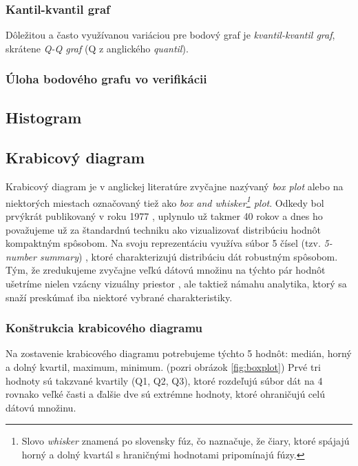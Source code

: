 \subsubsection{Kantil-kvantil graf}
Dôležitou a často využívanou variáciou pre bodový graf je \textit{kvantil-kvantil graf}, skrátene \textit{Q-Q graf} (Q z anglického \textit{quantil}).

\subsubsection{Úloha bodového grafu vo verifikácii}

\subsection{Histogram}

\subsection{Krabicový diagram}
\label{subsec:boxplot}
Krabicový diagram je v anglickej literatúre zvyčajne nazývaný \textit{box plot} alebo na niektorých miestach označovaný tiež ako \textit{box and whisker\footnote{Slovo \textit{whisker} znamená po slovensky fúz, čo naznačuje, že čiary, ktoré spájajú horný a dolný kvartál s hraničnými hodnotami pripomínajú fúzy.} plot}. Odkedy bol prvýkrát publikovaný v roku 1977 \cite{Tukey}, uplynulo už takmer 40 rokov a dnes ho považujeme už za štandardnú techniku ako vizualizovať distribúciu hodnôt kompaktným spôsobom. Na svoju reprezentáciu využíva súbor 5 čísel (tzv. \textit{5-number summary}) \cite{Potter}, ktoré charakterizujú distribúciu dát robustným spôsobom. Tým, že zredukujeme zvyčajne veľkú dátovú množinu na týchto pár hodnôt ušetríme nielen vzácny vizuálny priestor \cite{Wickham}, ale taktiež námahu analytika, ktorý sa snaží preskúmať iba niektoré vybrané charakteristiky. 

\subsubsection{Konštrukcia krabicového diagramu}

Na zostavenie krabicového diagramu potrebujeme týchto 5 hodnôt: medián, horný a dolný kvartil, maximum, minimum. (pozri obrázok \ref{fig:boxplot}) Prvé tri hodnoty sú takzvané kvartily (Q1, Q2, Q3), ktoré rozdeľujú súbor dát na 4 rovnako veľké časti a ďalšie dve sú extrémne hodnoty, ktoré ohraničujú celú dátovú množinu. 

